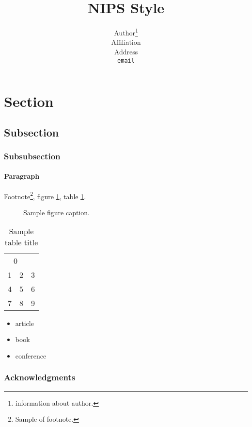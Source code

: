\documentclass{article}
\title{NIPS Style}
\author{
  Author\thanks{information about author.} \\
  Affiliation \\
  Address \\
  \texttt{email} \\
}
\begin{document}
\maketitle

\begin{abstract}
\end{abstract}

\section{Section}

\subsection{Subsection}

\subsubsection{Subsubsection}

\paragraph{Paragraph}
Footnote\footnote{Sample of footnote.}, figure \ref{sample-figure}, table \ref{sample-table}.

\newpage

\begin{figure}
  \centering
  \fbox{\rule[-.5cm]{0cm}{4cm} \rule[-.5cm]{4cm}{0cm}}
  \caption{Sample figure caption.}
  \label{sample-figure}
\end{figure}

\begin{table}
  \caption{Sample table title}
  \label{sample-table}
  \centering
  \begin{tabular}{lll}
    \toprule
    \multicolumn{2}{c}{0} \\
    \cmidrule(r){1-2}
    1 & 2 & 3 \\
    \midrule
    4 & 5 & 6 \\
    7 & 8 & 9 \\
    \bottomrule
  \end{tabular}
\end{table}

\begin{itemize}

\item article \cite{Silver2016}

\item book \cite{Goodfellow2016}

\item conference \cite{Krizhevsky2012}

\end{itemize}

\subsubsection*{Acknowledgments}

\medskip
\small

\end{document}
